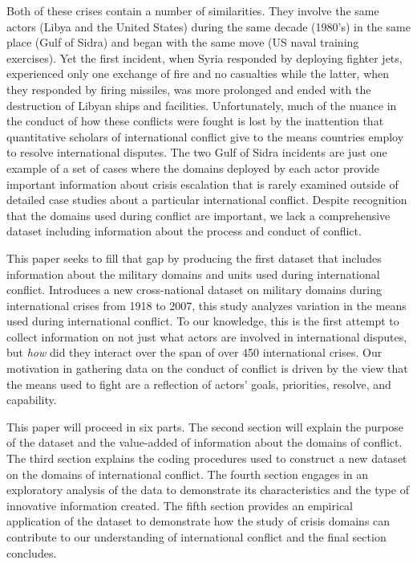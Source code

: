 \documentclass[12pt,letterpaper]{article}
\begin{document}
Both of these crises contain a number of similarities. They involve the same actors (Libya and the United States) during the same decade (1980's) in the same place (Gulf of Sidra) and began with the same move (US naval training exercises). Yet the first incident, when Syria responded by deploying fighter jets, experienced only one exchange of fire and no casualties while the latter, when they responded by firing missiles, was more prolonged and ended with the destruction of Libyan ships and facilities. Unfortunately, much of the nuance in the conduct of how these conflicts were fought is lost by the inattention that quantitative scholars of international conflict give to the means countries employ to resolve international disputes. The two Gulf of Sidra incidents are just one example of a set of cases where the domains deployed by each actor provide important information about crisis escalation that is rarely examined outside of detailed case studies about a particular international conflict. Despite recognition that the domains used during conflict are important, we lack a comprehensive dataset including information about the process and conduct of conflict.

This paper seeks to fill that gap by producing the first dataset that includes information about the military domains and units used during international conflict. Introduces a new cross-national dataset on military domains during international crises from 1918 to 2007, this study analyzes variation in the means used during international conflict. To our knowledge, this is the first attempt to collect information on not just what actors are involved in international disputes, but \textit{how} did they interact over the span of over 450 international crises. Our motivation in gathering data on the conduct of conflict is driven by the view that the means used to fight are a reflection of actors' goals, priorities, resolve, and capability.

This paper will proceed in six parts. The second section will explain the purpose of the dataset and the value-added of information about the domains of conflict. The third section explains the coding procedures used to construct a new dataset on the domains of international conflict. The fourth section engages in an exploratory analysis of the data to demonstrate its characteristics and the type of innovative information created. The fifth section provides an empirical application of the dataset to demonstrate how the study of crisis domains can contribute to our understanding of international conflict and the final section concludes.
\end{document}
